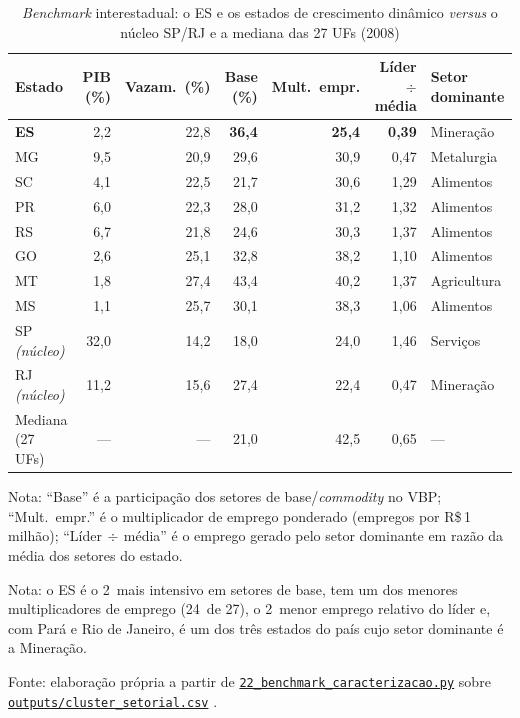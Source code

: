 \documentclass[11pt,a4paper]{article}
\begin{document}
\begin{table}[tbp]
\caption{\emph{Benchmark} interestadual: o ES e os estados de crescimento dinâmico
\emph{versus} o núcleo SP/RJ e a mediana das 27 UFs (2008)}
\label{tab:cluster}
\centering\small
\setlength{\tabcolsep}{4.5pt}
\begin{threeparttable}
\begin{tabular}{lrrrrrl}
\toprule
Estado & PIB (\%) & Vazam.\ (\%) & Base (\%) & Mult.\ empr. & Líder$\div$média & Setor dominante\\
\midrule
\textbf{ES} & 2,2 & 22,8 & \textbf{36,4} & \textbf{25,4} & \textbf{0,39} & Mineração\\
MG & 9,5 & 20,9 & 29,6 & 30,9 & 0,47 & Metalurgia\\
SC & 4,1 & 22,5 & 21,7 & 30,6 & 1,29 & Alimentos\\
PR & 6,0 & 22,3 & 28,0 & 31,2 & 1,32 & Alimentos\\
RS & 6,7 & 21,8 & 24,6 & 30,3 & 1,37 & Alimentos\\
GO & 2,6 & 25,1 & 32,8 & 38,2 & 1,10 & Alimentos\\
MT & 1,8 & 27,4 & 43,4 & 40,2 & 1,37 & Agricultura\\
MS & 1,1 & 25,7 & 30,1 & 38,3 & 1,06 & Alimentos\\
\midrule
SP \emph{(núcleo)} & 32,0 & 14,2 & 18,0 & 24,0 & 1,46 & Serviços\\
RJ \emph{(núcleo)} & 11,2 & 15,6 & 27,4 & 22,4 & 0,47 & Mineração\\
\midrule
Mediana (27 UFs) & --- & --- & 21,0 & 42,5 & 0,65 & ---\\
\bottomrule
\end{tabular}
\begin{tablenotes}[flushleft]\footnotesize
\item Nota: ``Base'' é a participação dos setores de base/\emph{commodity} no VBP;
``Mult.\ empr.'' é o multiplicador de emprego ponderado (empregos por R\$\,1 milhão);
``Líder$\,\div\,$média'' é o emprego gerado pelo setor dominante em razão da média dos
setores do estado.
\item Nota: o ES é o 2\textordmasculine\ mais intensivo em setores de base, tem um dos menores
multiplicadores de emprego (24\textordmasculine\ de 27), o 2\textordmasculine\ menor emprego
relativo do líder e, com Pará e Rio de Janeiro, é um dos três estados do país cujo setor
dominante é a Mineração.
\item Fonte: elaboração própria a partir de
\href{https://github.com/fcarva/es-insumo-produto/blob/116a350/pesquisa/22_benchmark_caracterizacao.py}{\texttt{22\_benchmark\_caracterizacao.py}}
sobre
\href{https://github.com/fcarva/es-insumo-produto/blob/116a350/pesquisa/outputs/cluster_setorial.csv}{\texttt{outputs/cluster\_setorial.csv}}
\citep{carvalho2026repo}.
\end{tablenotes}
\end{threeparttable}
\end{table}
\end{document}
